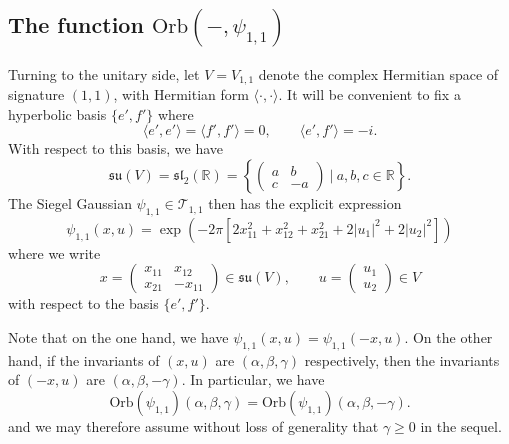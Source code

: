 \documentclass[reqno, 11pt]{amsart} %
\numberwithin{equation}{section}
\theoremstyle{plain}
\theoremstyle{definition}
\theoremstyle{remark}
\newcommand{\bbR}{\mathbb R}
\newcommand{\lie}[1]{ \mathfrak{#1}}
\newcommand{\Orb}{\mathrm{Orb}}
\begin{document}
\subsection{The function $\Orb(-,\psi_{1,1})$}
Turning to the unitary side, let $V = V_{1,1}$ denote the complex Hermitian space of signature $(1,1)$, with Hermitian form
$\langle \cdot, \cdot \rangle$. It will be convenient to fix a hyperbolic basis $\{ e', f'\}$
where
\[
\langle e', e' \rangle = \langle f', f' \rangle = 0, \qquad \langle e', f' \rangle = -i.
\]
With respect to this basis, we have
\[
\lie{su}(V) = \lie{sl}_2(\bbR) = \left\{  \begin{pmatrix} a & b \\ c & -a \end{pmatrix} \ | \ a,b,c \in \mathbb R\right\}.
\]
The Siegel Gaussian $\psi_{1,1} \in \mathcal T_{1,1}$ then has the explicit expression
\begin{equation}  \label{eqn:psi11 hyberbolic}
\psi_{1,1}(x,u) = \exp\left( - 2 \pi \left[2 x_{11}^2 + x_{12}^2 + x_{21}^2  + 2|u_1|^2 + 2 |u_2|^2 \right]  \right)
\end{equation}
where we write
\[
x = \begin{pmatrix} x_{11} & x_{12} \\ x_{21} & -x_{11} \end{pmatrix} \in \lie{su}(V), \qquad  u = \begin{pmatrix} u_1 \\ u_2 \end{pmatrix} \in V
\]
with respect to the basis $\{ e', f'\}$.

Note that on the one hand, we have $\psi_{1,1}(x,u) = \psi_{1,1}(-x,u)$. On the other hand, if the invariants of $(x,u)$ are $(\alpha,\beta,\gamma)$ respectively, then the invariants of $(-x,u)$ are $(\alpha, \beta, -\gamma)$. In particular, we have
\[
\Orb(\psi_{1,1})(\alpha, \beta, \gamma) = \Orb(\psi_{1,1})(\alpha, \beta, -\gamma).
\]
and we may therefore assume without loss of generality that $\gamma \geq 0$ in the sequel.
\end{document}
